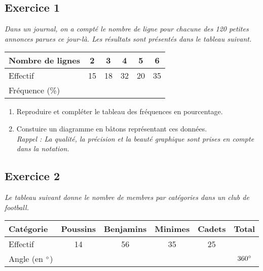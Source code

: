 \documentclass[12pt]{article}
\begin{document}
\begin{multicols}{2}

  \subsection*{Exercice 1} 

  \textit{Dans un journal, on a compté le nombre de ligne pour chacune des 120 petites annonces parues ce jour-là. Les résultats sont présentés dans le tableau suivant.}

  \begin{center}
    \begin{tabular}{| l || c | c | c | c | c | }
      \hline
      Nombre de lignes  & 2 &  3 &  4 &  5 &  6 \\
      \hline
      Effectif          & 15 & 18 & 32 & 20 & 35 \\ 
      \hline
      Fréquence (\%)    &   &    &    &    &    \\
      \hline
    \end{tabular}
  \end{center}

  \begin{enumerate}
  \item Reproduire et compléter le tableau des fréquences en pourcentage.
  \item Constuire un diagramme en bâtons représentant ces données. \\
    \textit{Rappel : La qualité, la précision et la beauté graphique sont prises en compte dans la notation.}

  \end{enumerate}

\end{multicols}

\subsection*{Exercice 2} 

\textit{Le tableau suivant donne le nombre de membres par catégories dans un club de football.}

\begin{center}
  \begin{tabular}{| l || c | c | c | c | c | }
    \hline
    Catégorie            & Poussins & Benjamins & Minimes & Cadets & Total         \\
    \hline
    Effectif             &       14 &        56 &      35 &    25  &               \\
    \hline
    Angle (en $\degree$) &          &           &         &        & $360 \degree$ \\
    \hline
  \end{tabular}
\end{center}
\end{document}
